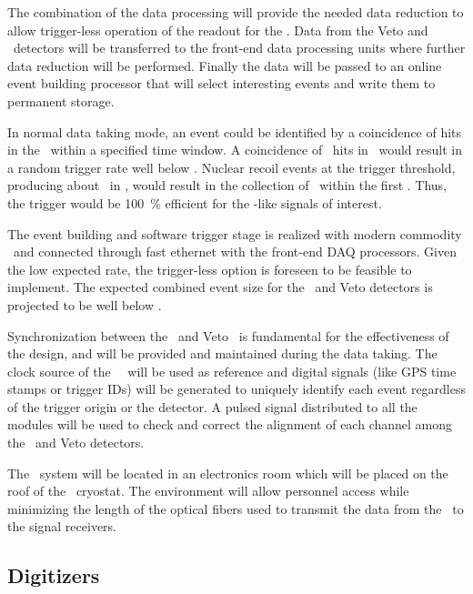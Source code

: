 The combination of the data processing will provide the needed data reduction to allow trigger-less operation of the readout for the \TPC.  Data from the Veto and \TPC\ detectors will be transferred to the front-end data processing units where further data reduction will be performed.  Finally the data will be passed to an online event building processor that will select interesting events and write them to permanent storage.

In normal data taking mode, an event could be identified by a coincidence of hits in the \TPC\ within a specified time window.  A coincidence of \DSkTriggerThresholdHits\ hits in \DSkTriggerThresholdWindow\ would result in a random trigger rate well below \DSkTriggerRandomRate.  Nuclear recoil events at the trigger threshold, producing about \DSkWIMPMinPE\ in \DSkWIMPMinPETimeWindow, would result in the collection of \DSkWIMPMinTwoHundredns\ within the first \DSkTriggerThresholdWindow.  Thus, the trigger would be \SI{100}{\percent} efficient for the \WIMP-like signals of interest.  

The event building and software trigger stage is realized with modern commodity \CPUs\ and connected through fast ethernet with the front-end DAQ processors.  Given the low expected rate, the trigger-less option is foreseen to be feasible to implement.  The expected combined event size for the \TPC\ and Veto detectors is projected to be well below \DSkDAQGlobalEventSizeUpperLimit.

Synchronization between the \TPC\ and Veto \DAQ\ is fundamental for the effectiveness of the design, and will be provided and maintained during the data taking.  The clock source of the \TPC\ \DAQ\ will be used as reference and digital signals (like GPS time stamps or trigger IDs) will be generated to uniquely identify each event regardless of the trigger origin or the detector.  A pulsed signal distributed to all the modules will be used to check and correct the alignment of each channel among the \TPC\ and Veto detectors.

The \DAQ\ system will be located in an electronics room which will be placed on the roof of the \AAr\ cryostat.  The environment will allow personnel access while minimizing the length of the optical fibers used to transmit the data from the \TPC\ to the signal receivers.


\subsection{Digitizers}

